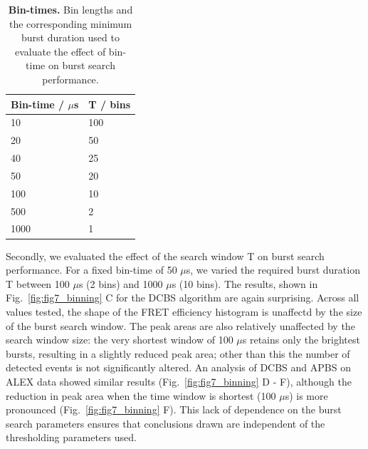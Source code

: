 \begin{table}[!ht]
\caption{
{\bf{Bin-times}.} Bin lengths and the corresponding minimum burst duration used to evaluate the effect of bin-time on burst search performance.}
\begin{tabular}{|l|l|}
\hline
Bin-time / $\mu$s & T / bins \\
\hline
10 & 100 \\
20 & 50 \\
40 & 25 \\
50 & 20 \\
100 & 10 \\
500 & 2 \\
1000 & 1\\
\hline
\end{tabular}

\label{tab:bin-times}
\end{table}

Secondly, we evaluated the effect of the search window T on burst search performance. For a fixed bin-time of 50 $\mu$s, we varied the required burst duration T between 100 $\mu$s (2 bins) and 1000 $\mu$s (10 bins). The results, shown in Fig.~\ref{fig:fig7_binning} C for the DCBS algorithm are again surprising. Across all values tested, the shape of the FRET efficiency histogram is unaffectd by the size of the burst search window. The peak areas are also relatively unaffected by the search window size: the very shortest window of 100 $\mu$s retains only the brightest bursts, resulting in a slightly reduced peak area; other than this the number of detected events is not significantly altered. An analysis of DCBS and APBS on ALEX data showed similar results (Fig.~\ref{fig:fig7_binning} D - F), although the reduction in peak area when the time window is shortest (100 $\mu$s) is more pronounced (Fig.~\ref{fig:fig7_binning} F). This lack of dependence on the burst search parameters ensures that conclusions drawn are independent of the thresholding parameters used.

